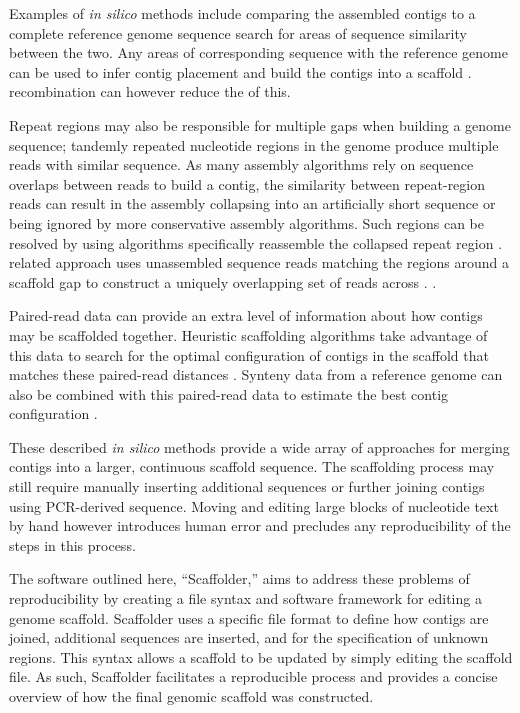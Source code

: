 \documentclass[10pt]{bmc_article}
\newenvironment{bmcformat}{\begin{raggedright}\baselineskip20pt\sloppy\setboolean{publ}{false}}{\end{raggedright}\baselineskip20pt\sloppy}
\begin{document}
\begin{bmcformat}
Examples of \emph{in silico} methods include 
comparing the assembled contigs to a complete reference genome sequence
 search for areas of sequence similarity between the
two. Any areas of corresponding sequence with the reference genome can be used
to infer contig placement and build the contigs into a scaffold
\cite{richter2007,zhao2008,assefa2009}.  recombination
 can however reduce the
 of this. \pb

Repeat regions may also be responsible for multiple gaps when building
a genome sequence; tandemly repeated nucleotide regions in the genome produce
multiple reads with similar sequence. As many assembly algorithms rely on
sequence overlaps between reads to build a contig, the similarity between
repeat-region reads can result in the assembly collapsing into an artificially
short sequence or being ignored by more conservative assembly algorithms. Such
regions can be resolved by using algorithms  specifically reassemble
the collapsed repeat region  \cite{mulyukov2002,koren2010}.
 related approach uses unassembled sequence reads matching
the regions around a scaffold gap to construct a uniquely overlapping set of
reads across . \cite{tsai2010}. \pb

Paired-read data can provide an extra level of information about how contigs
may be scaffolded together. Heuristic scaffolding algorithms take advantage of
this data to search for the optimal configuration of contigs in the scaffold
that matches these paired-read distances \cite{dayarian2010,boetzer2011}.
Synteny data from a reference genome can also be combined with this
paired-read data to estimate the best contig configuration \cite{pop2004}. \pb

These described \emph{in silico} methods provide a wide array of approaches for
merging contigs into a larger, continuous scaffold sequence.
 The scaffolding process may still require manually
inserting additional sequences or further joining contigs using PCR-derived
sequence. Moving and editing large blocks of nucleotide text by hand however
 introduces human error and precludes any reproducibility of
the steps in this process. \pb

The software outlined here, ``Scaffolder,'' aims to address these problems of
reproducibility by creating a file syntax and software framework for editing
a genome scaffold. Scaffolder uses a specific file format to define how
contigs are joined, additional sequences are inserted, and for the
specification of unknown regions. This syntax allows a scaffold to be updated
by simply editing the scaffold file. As such, Scaffolder facilitates
a reproducible  process and provides a concise
overview of how the final genomic scaffold was constructed. \pb


\end{bmcformat}
\end{document}
